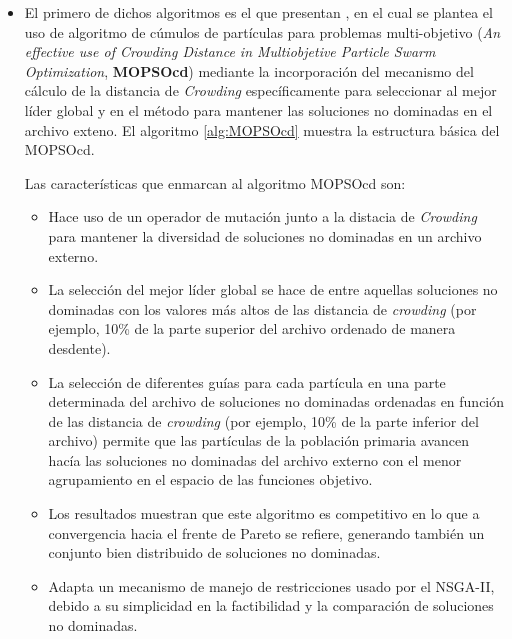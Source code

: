   \begin{itemize}
   \item El primero de dichos algoritmos es el que presentan \cite{Raquel2005}, en el cual se 
  plantea el uso de algoritmo de c\'umulos de part\'iculas para problemas multi-objetivo (\textit{An effective use of Crowding Distance 
  in Multiobjetive Particle Swarm Optimization}, \textbf{MOPSOcd}) mediante la incorporaci\'on del mecanismo del c\'alculo de la distancia 
  de \textit{Crowding} espec\'ificamente para seleccionar al mejor l\'ider global y en el m\'etodo para mantener las soluciones no dominadas 
  en el archivo exteno. El algoritmo \ref{alg:MOPSOcd} muestra la estructura b\'asica del MOPSOcd.
  
  Las caracter\'isticas que enmarcan al algoritmo MOPSOcd son:
  
  \begin{itemize}
   \item Hace uso de un operador de mutaci\'on junto a la distacia de \textit{Crowding} para mantener la 
  diversidad de soluciones no dominadas en un archivo externo.  
  \item La selecci\'on del mejor l\'ider global se hace de entre aquellas soluciones 
  no dominadas con los valores m\'as altos de las distancia de \textit{crowding} (por ejemplo, 10\% de  la parte superior 
  del archivo ordenado de manera desdente). 
  \item La selecci\'on de diferentes gu\'ias para cada part\'icula en una parte determinada del archivo 
  de soluciones no dominadas ordenadas en funci\'on de las distancia de \textit{crowding} 
  (por ejemplo, 10\% de  la parte inferior del archivo)
  permite que las part\'iculas de la poblaci\'on primaria avancen hac\'ia las soluciones no dominadas del archivo externo con el menor 
  agrupamiento en el espacio de las funciones objetivo. 
  \item Los resultados muestran que este algoritmo es competitivo en lo que a 
  convergencia hacia el frente de Pareto se refiere, generando tambi\'en un conjunto bien distribuido de soluciones no dominadas. 
  \item Adapta un mecanismo de manejo de restricciones usado por el NSGA-II, debido a su simplicidad en la factibilidad y la comparaci\'on 
  de soluciones no dominadas.
  \end{itemize}  
 

\end{itemize}

